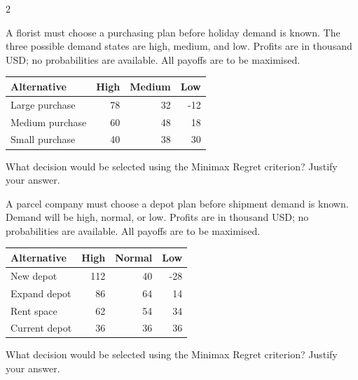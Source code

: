 \begin{multicols}{2}
\begin{minipage}{\linewidth}
A florist must choose a purchasing plan before holiday demand is known. The three possible demand states are high, medium, and low. Profits are in thousand USD; no probabilities are available. All payoffs are to be maximised.
\begin{center}\small\setlength{\tabcolsep}{4pt}
\begin{tabular}{@{}lrrr@{}}\toprule
Alternative&High&Medium&Low\\\midrule
Large purchase&78&32&-12\\
Medium purchase&60&48&18\\
Small purchase&40&38&30\\\bottomrule
\end{tabular}\end{center}

What decision would be selected using the Minimax Regret criterion? Justify your answer. 
\end{minipage}\par

\begin{minipage}{\linewidth}
A parcel company must choose a depot plan before shipment demand is known. Demand will be high, normal, or low. Profits are in thousand USD; no probabilities are available. All payoffs are to be maximised.
\begin{center}\small\setlength{\tabcolsep}{4pt}
\begin{tabular}{@{}lrrr@{}}\toprule
Alternative&High&Normal&Low\\\midrule
New depot&112&40&-28\\
Expand depot&86&64&14\\
Rent space&62&54&34\\
Current depot&36&36&36\\\bottomrule
\end{tabular}\end{center}

What decision would be selected using the Minimax Regret criterion? Justify your answer. 
\end{minipage}\par


\end{multicols}
